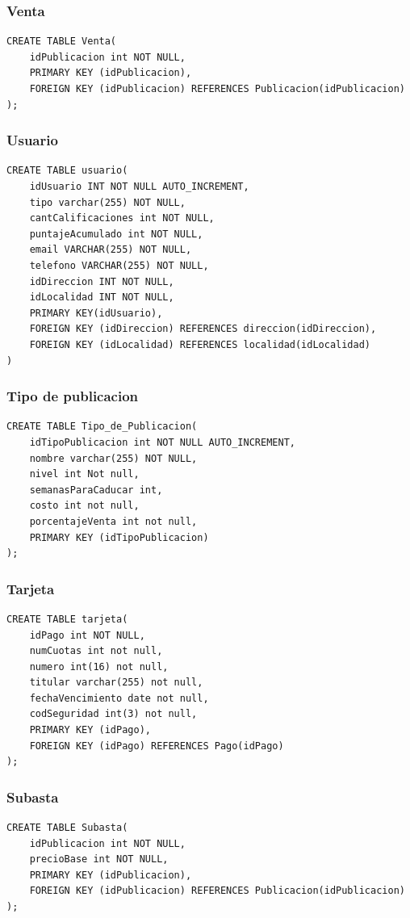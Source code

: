 \documentclass[a4paper, 10pt, twoside]{article}
\begin{document}
\subsubsection{Venta}
\begin{verbatim}
CREATE TABLE Venta(
	idPublicacion int NOT NULL,
	PRIMARY KEY (idPublicacion),
    FOREIGN KEY (idPublicacion) REFERENCES Publicacion(idPublicacion)
);
\end{verbatim}

\subsubsection{Usuario}
\begin{verbatim}
CREATE TABLE usuario(
	idUsuario INT NOT NULL AUTO_INCREMENT,
	tipo varchar(255) NOT NULL,
    cantCalificaciones int NOT NULL,
    puntajeAcumulado int NOT NULL,
    email VARCHAR(255) NOT NULL,
    telefono VARCHAR(255) NOT NULL,
    idDireccion INT NOT NULL,
    idLocalidad INT NOT NULL, 
    PRIMARY KEY(idUsuario),
    FOREIGN KEY (idDireccion) REFERENCES direccion(idDireccion),
    FOREIGN KEY (idLocalidad) REFERENCES localidad(idLocalidad)
)
\end{verbatim}
\subsubsection{Tipo de publicacion}
\begin{verbatim}
CREATE TABLE Tipo_de_Publicacion(
	idTipoPublicacion int NOT NULL AUTO_INCREMENT,
    nombre varchar(255) NOT NULL,
    nivel int Not null,
    semanasParaCaducar int,
    costo int not null,
    porcentajeVenta int not null,
    PRIMARY KEY (idTipoPublicacion)
);
\end{verbatim}
\subsubsection{Tarjeta}
\begin{verbatim}
CREATE TABLE tarjeta(
	idPago int NOT NULL,
    numCuotas int not null,
    numero int(16) not null,
    titular varchar(255) not null,
    fechaVencimiento date not null,
    codSeguridad int(3) not null,
	PRIMARY KEY (idPago),
    FOREIGN KEY (idPago) REFERENCES Pago(idPago)
);
\end{verbatim}
\subsubsection{Subasta}
\begin{verbatim}
CREATE TABLE Subasta(
	idPublicacion int NOT NULL,
	precioBase int NOT NULL, 
	PRIMARY KEY	(idPublicacion),
	FOREIGN KEY (idPublicacion) REFERENCES Publicacion(idPublicacion)
);
\end{verbatim}
\end{document}
